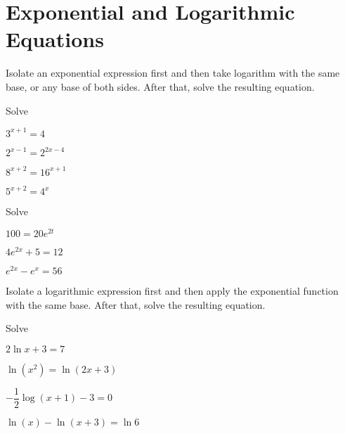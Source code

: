 \newpage
\section{Exponential and Logarithmic Equations}

\begin{howto}
 Isolate an exponential expression first and then take logarithm with the same base, or any base of both sides. After that, solve the resulting equation.
\end{howto}

\begin{example}
  Solve\\ 
  \begin{enumerate*}
    \item $3^{x+1}=4$
    \item $2^{x-1}=2^{2x-4}$
    \item $8^{x+2}={16}^{x+1}$
    \item $5^{x+2}=4^x$
  \end{enumerate*}  
\end{example}

\begin{example}
  Solve\\ 
  \begin{enumerate*}
    \item $100=20e^{2t}$
    \item $4e^{2x}+5=12$
    \item $e^{2x}-e^x=56$
  \end{enumerate*}  
\end{example}

\newpage

\begin{howto}
  Isolate a logarithmic expression first and then apply the exponential function with the same base. After that, solve the resulting equation.
\end{howto}

\begin{example}
  Solve\\
\begin{enumerate*}
  \item $2\ln x+3=7$
  \item $\ln(x^2)=\ln(2x+3)$
  \item $-\dfrac{1}{2}\log (x+1)-3=0$
  \item $\ln (x)-\ln (x+3)=\ln 6$
\end{enumerate*}
\end{example}


